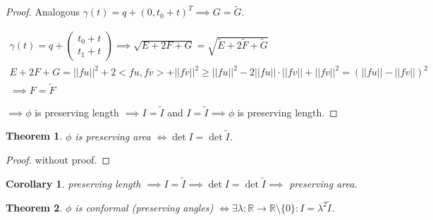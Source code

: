 \documentclass[]{article}
\newtheorem{theorem}{Theorem}
\newtheorem{corollary}{Corollary}
\begin{document}
\begin{proof}
	Analogous $\gamma(t) = q + (0, t_0+t)^T \implies G = \tilde{G}$.
	
	\begin{align*}
		\gamma(t) = q + \left(\begin{matrix}
			t_0 + t \\ t_1 + t
		\end{matrix}\right) \implies \sqrt{E + 2F + G} = \sqrt{\tilde{E} + 2\tilde{F} + \tilde{G}}\\
		E+2F+G = ||fu||^2 + 2 <fu, fv> + ||fv||^2 \geq ||fu||^2 - 2||fu||\cdot ||fv|| + ||fv||^2 = (||fu||- ||fv||)^2\\
		\implies F = \tilde{F}
	\end{align*}
	
	$\implies \phi$ is preserving length $\implies I = \tilde{I}$ and $I = \tilde{I} \implies \phi$ is preserving length.
\end{proof}

\begin{theorem}
	$\phi$ is preserving area $\iff \det I = \det \tilde{I}$.
\end{theorem}

\begin{proof}
	without proof.
\end{proof}

\begin{corollary}
	preserving length $\implies I = \tilde{I} \implies \det I = \det \tilde{I} \implies$ preserving area.
\end{corollary}

\begin{theorem}
	$\phi$ is conformal (preserving angles) $\iff \exists \lambda: \mathbb{R} \rightarrow \mathbb{R}\setminus\{0\}: I = \lambda^2 \tilde{I}$.
\end{theorem}
\end{document}
